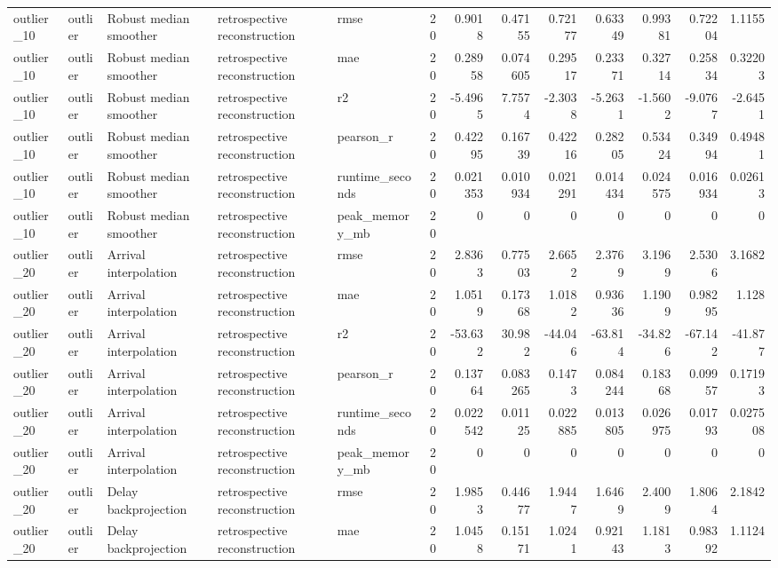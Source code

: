 \begin{table}[!htbp]
{{\begin{tabular}{lllllrrrrrrrr}
outlier_10 & outlier & Robust median smoother & retrospective reconstruction & rmse & 20 & 0.9018 & 0.47155 & 0.72177 & 0.63349 & 0.99381 & 0.72204 & 1.1155 \\
outlier_10 & outlier & Robust median smoother & retrospective reconstruction & mae & 20 & 0.28958 & 0.074605 & 0.29517 & 0.23371 & 0.32714 & 0.25834 & 0.32203 \\
outlier_10 & outlier & Robust median smoother & retrospective reconstruction & r2 & 20 & -5.4965 & 7.7574 & -2.3038 & -5.2631 & -1.5602 & -9.0767 & -2.6451 \\
outlier_10 & outlier & Robust median smoother & retrospective reconstruction & pearson_r & 20 & 0.42295 & 0.16739 & 0.42216 & 0.28205 & 0.53424 & 0.34994 & 0.49481 \\
outlier_10 & outlier & Robust median smoother & retrospective reconstruction & runtime_seconds & 20 & 0.021353 & 0.010934 & 0.021291 & 0.014434 & 0.024575 & 0.016934 & 0.02613 \\
outlier_10 & outlier & Robust median smoother & retrospective reconstruction & peak_memory_mb & 20 & 0 & 0 & 0 & 0 & 0 & 0 & 0 \\
outlier_20 & outlier & Arrival interpolation & retrospective reconstruction & rmse & 20 & 2.8363 & 0.77503 & 2.6652 & 2.3769 & 3.1969 & 2.5306 & 3.1682 \\
outlier_20 & outlier & Arrival interpolation & retrospective reconstruction & mae & 20 & 1.0519 & 0.17368 & 1.0182 & 0.93636 & 1.1909 & 0.98295 & 1.128 \\
outlier_20 & outlier & Arrival interpolation & retrospective reconstruction & r2 & 20 & -53.632 & 30.982 & -44.046 & -63.814 & -34.826 & -67.142 & -41.877 \\
outlier_20 & outlier & Arrival interpolation & retrospective reconstruction & pearson_r & 20 & 0.13764 & 0.083265 & 0.1473 & 0.084244 & 0.18368 & 0.09957 & 0.17193 \\
outlier_20 & outlier & Arrival interpolation & retrospective reconstruction & runtime_seconds & 20 & 0.022542 & 0.01125 & 0.022885 & 0.013805 & 0.026975 & 0.01793 & 0.027508 \\
outlier_20 & outlier & Arrival interpolation & retrospective reconstruction & peak_memory_mb & 20 & 0 & 0 & 0 & 0 & 0 & 0 & 0 \\
outlier_20 & outlier & Delay backprojection & retrospective reconstruction & rmse & 20 & 1.9853 & 0.44677 & 1.9447 & 1.6469 & 2.4009 & 1.8064 & 2.1842 \\
outlier_20 & outlier & Delay backprojection & retrospective reconstruction & mae & 20 & 1.0458 & 0.15171 & 1.0241 & 0.92143 & 1.1813 & 0.98392 & 1.1124 \\

\end{tabular}}}
\end{table}
